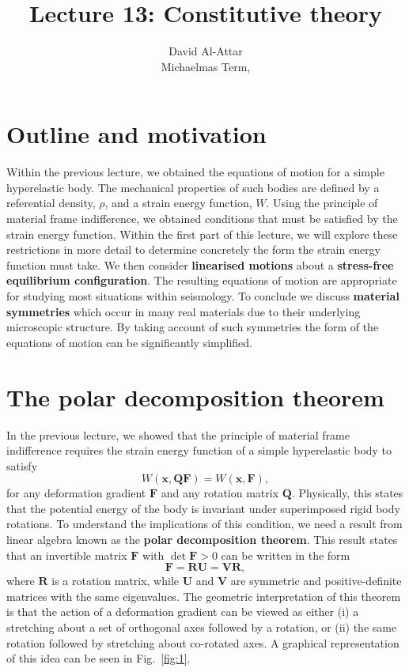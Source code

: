 \documentclass [a4paper,12pt]{paper}
\begin{document}
\title{Lecture 13: Constitutive theory}
\author{David Al-Attar \\ Michaelmas Term, \the\year}



\maketitle

\section*{Outline and motivation}

Within the previous lecture, we obtained the equations of motion for a simple hyperelastic body. The mechanical properties
of such bodies are defined by a referential density, $\rho$, and a strain energy function, $W$. Using the principle of material 
frame indifference, we obtained conditions that must be satisfied by the strain energy function. Within the first part of this lecture, 
we will explore these restrictions in more detail to determine concretely the form the strain energy function must take. We then consider 
\textbf{linearised motions} about a \textbf{stress-free equilibrium configuration}. The resulting equations of motion are appropriate for studying most 
situations within seismology. To conclude we discuss \textbf{material symmetries} which occur in many real materials due to their underlying 
microscopic structure. By taking account of such symmetries the form of the equations of motion can be significantly simplified.

\section*{The polar decomposition theorem}

In the previous lecture, we showed that the principle of material frame indifference requires the strain energy function of a simple hyperelastic body to satisfy
\begin{equation}
W(\mathbf{x}, \mathbf{Q}\mathbf{F}) = W(\mathbf{x}, \mathbf{F}),
\end{equation}
for any deformation gradient $\mathbf{F}$ and any rotation matrix $\mathbf{Q}$. Physically, this states that the potential
energy of the body is invariant under superimposed rigid body rotations. To understand the implications of this condition,
we need a result from linear algebra known as the \textbf{polar decomposition theorem}. This result states that an invertible matrix 
$\mathbf{F}$ with $\det \mathbf{F} > 0$ can be written in the form
\begin{equation}
\mathbf{F} = \mathbf{R}\mathbf{U} = \mathbf{V}\mathbf{R},
\end{equation}
where $\mathbf{R}$ is a rotation matrix, while $\mathbf{U}$ and $\mathbf{V}$ are symmetric and positive-definite 
matrices with the same eigenvalues. The geometric interpretation of this theorem is that the action of a deformation 
gradient can be viewed as either (i) a stretching about a set of orthogonal axes followed by a rotation, or (ii) the same 
rotation followed by stretching about co-rotated axes. A graphical representation of this idea
can be seen in Fig.~\ref{fig:1}.
\end{document}
